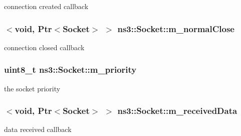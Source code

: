 connection created callback 

\subsubsection[{\texorpdfstring{m\+\_\+normal\+Close}{m_normalClose}}]{$<$void, {\bf Ptr}$<${\bf Socket}$>$ $>$ ns3\+::\+Socket\+::m\+\_\+normal\+Close\hspace{0.3cm}{\ttfamily [private]}}\hypertarget{classns3_1_1Socket_a097d37abd77901b0b71f9c967f7f4dd8}{}\label{classns3_1_1Socket_a097d37abd77901b0b71f9c967f7f4dd8}


connection closed callback 

\subsubsection[{\texorpdfstring{m\+\_\+priority}{m_priority}}]{\setlength{\rightskip}{0pt plus 5cm}uint8\+\_\+t ns3\+::\+Socket\+::m\+\_\+priority\hspace{0.3cm}{\ttfamily [private]}}\hypertarget{classns3_1_1Socket_a19f31446cdeb7ed8f68778d14525941b}{}\label{classns3_1_1Socket_a19f31446cdeb7ed8f68778d14525941b}


the socket priority 

\subsubsection[{\texorpdfstring{m\+\_\+received\+Data}{m_receivedData}}]{$<$void, {\bf Ptr}$<${\bf Socket}$>$ $>$ ns3\+::\+Socket\+::m\+\_\+received\+Data\hspace{0.3cm}{\ttfamily [private]}}\hypertarget{classns3_1_1Socket_ab04cba5133e96fef09ca9bad8a864243}{}\label{classns3_1_1Socket_ab04cba5133e96fef09ca9bad8a864243}


data received callback 


